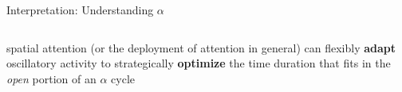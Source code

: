 \begin{frame}{Interpretation: Understanding $\alpha$}
\begin{columns}
\begin{column}{0.55\textwidth}
{{\begin{itemize}
                spatial attention {\footnotesize(or the deployment of attention in general)} can flexibly \textcolor{lightlavender}{\textbf{{adapt}}} oscillatory activity to strategically \textcolor{lightlavender}{\textbf{{optimize}}} the time duration that fits in the \textit{open} portion of an $\alpha$ cycle
            \end{itemize}}
            }
        
        \end{column}
        \end{columns}
    
\end{frame}